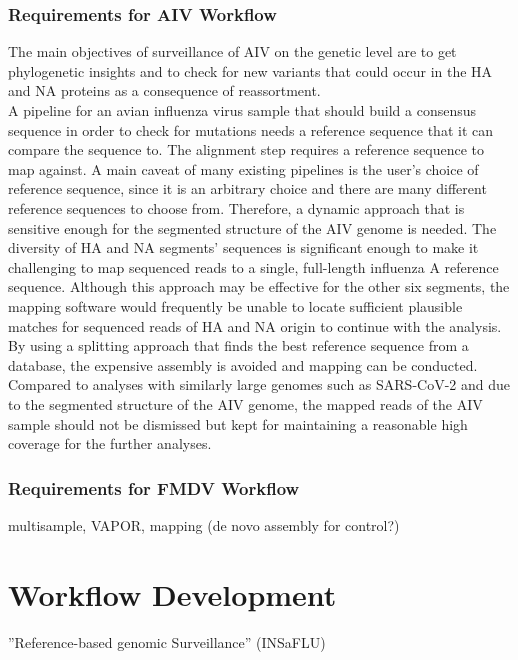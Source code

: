 \subsubsection{Requirements for AIV Workflow}
The main objectives of surveillance of AIV on the genetic level are to get phylogenetic insights and to check for new variants that could occur in the HA and NA proteins as a consequence of reassortment. \\
A pipeline for an avian influenza virus sample that should build a consensus sequence in order to check for mutations needs a reference sequence that it can compare the sequence to. The alignment step requires a reference sequence to map against. A main caveat of many existing pipelines is the user's choice of reference sequence, since it is an arbitrary choice and there are many different reference sequences to choose from. Therefore, a dynamic approach that is sensitive enough for the segmented structure of the AIV genome is needed. The diversity of HA and NA segments' sequences is significant enough to make it challenging to map sequenced reads to a single, full-length influenza A reference sequence. Although this approach may be effective for the other six segments, the mapping software would frequently be unable to locate sufficient plausible matches for sequenced reads of HA and NA origin to continue with the analysis. By using a splitting approach that finds the best reference sequence from a database, the expensive assembly is avoided and mapping can be conducted. \\
Compared to analyses with similarly large genomes such as SARS-CoV-2 and due to the segmented structure of the AIV genome, the mapped reads of the AIV sample should not be dismissed but kept for maintaining a reasonable high coverage for the further analyses. 



\subsubsection{Requirements for FMDV Workflow}
multisample, VAPOR, mapping (de novo assembly for control?)

\section{Workflow Development}
''Reference-based genomic Surveillance'' (INSaFLU)

